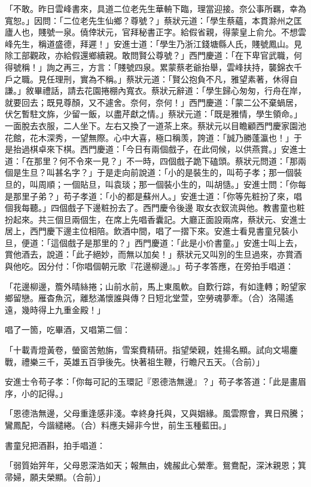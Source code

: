 \begin{showcontents}{}
「不敢。昨日雲峰書來，具道二位老先生華輈下臨，理當迎接。奈公事所羈，幸為寬恕。」因問：「二位老先生仙鄉？尊號？」蔡狀元道：「學生蔡蘊，本貫滁州之匡廬人也，賤號一泉。僥倖狀元，官拜秘書正字。給假省親，得蒙皇上俞允。不想雲峰先生，稱道盛德，拜遲！」安進士道：「學生乃浙江錢塘縣人氏，賤號鳳山。見除工部觀政，亦給假還鄉續親。敢問賢公尊號？」西門慶道：「在下卑官武職，何得號稱！」詢之再三，方言：「賤號四泉。累蒙蔡老爺抬舉，雲峰扶持，襲錦衣千戶之職。見任理刑，實為不稱。」蔡狀元道：「賢公抱負不凡，雅望素著，休得自謙。」敘畢禮話，請去花園捲棚內寬衣。蔡狀元辭道：「學生歸心匆匆，行舟在岸，就要回去；既見尊顏，又不遽舍。奈何，奈何！」西門慶道：「蒙二公不棄蝸居，伏乞暫駐文旆，少留一飯，以盡芹獻之情。」蔡狀元道：「既是雅情，學生領命。」一面脫去衣服，二人坐下。左右又換了一道茶上來。蔡狀元以目瞻顧西門慶家園池花館，花木深秀，一望無際。心中大喜，極口稱羡，誇道：「誠乃勝蓬瀛也！」于是抬過棋卓來下棋。西門慶道：「今日有兩個戲子，在此伺候，以供燕賞。」安進士道：「在那里？何不令來一見？」不一時，四個戲子跪下磕頭。蔡狀元問道：「那兩個是生旦？叫甚名字？」于是走向前說道：「小的是裝生的，叫苟子孝；那一個裝旦的，叫周順；一個貼旦，叫袁琰；那一個裝小生的，叫胡慥。」安進士問：「你每是那里子弟？」苟子孝道：「小的都是蘇州人。」安進士道：「你等先粧扮了來，唱個我每聽。」四個戲子下邊粧扮去了。西門慶令後邊 取女衣釵流與他。教書童也粧扮起來。共三個旦兩個生，在席上先唱香囊記。大廳正面設兩席，蔡狀元、安進士居上，西門慶下邊主位相陪。飲酒中間，唱了一摺下來。安進士看見書童兒裝小旦，便道：「這個戲子是那里的？」西門慶道：「此是小价書童。」安進士叫上去，賞他酒去，說道：「此子絕妙，而無以加矣！」蔡狀元又叫別的生旦過來，亦賞酒與他吃。因分付：「你唱個朝元歌『花邊柳邊』。」苟子孝答應，在旁拍手唱道：

「花邊柳邊，簷外晴絲捲；山前水前，馬上東風軟。自歎行踪，有如逢轉；盼望家鄉留戀。雁杳魚沉，離愁滿懷誰與傳？日短北堂萱，空勞魂夢牽。（合）洛陽遙遠，幾時得上九重金殿！」

唱了一箇，吃畢酒，又唱第二個：

「十載青燈黃卷，螢窗苦勉旃，雪案費精研。指望榮親，姓揚名顯。試向文場鏖戰，禮樂三千，英雄五百爭後先。快著祖生鞭，行瞻尺五天。（合前）」

安進士令苟子孝：「你每可記的玉環記『恩德浩無邊』？」苟子孝答道：「此是畫眉序，小的記得。」

「恩德浩無邊，父母重逢感非淺。幸終身托與，又與姻緣。風雲際會，異日飛騰；鸞鳳配，今諧繾綣。（合）料應夫婦非今世，前生玉種藍田。」

書童兒把酒斟，拍手唱道：

「弱質始笄年，父母恩深浩如天；報無由，媿赧此心縈牽。鴛鴦配，深沐親恩；箕帚婦，願夫榮顯。（合前）」


\end{showcontents}
